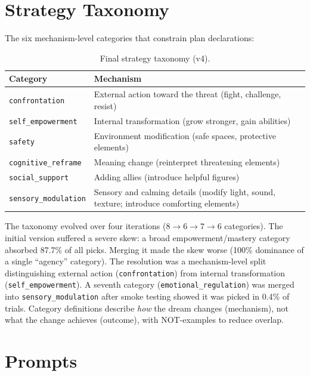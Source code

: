 \section{Strategy Taxonomy}
\label{app:taxonomy}

The six mechanism-level categories that constrain plan declarations:

\begin{table}[h]
  \centering\small
  \begin{tabular}{lp{9.5cm}}
    \toprule
    Category & Mechanism \\
    \midrule
    \texttt{confrontation} & External action toward the threat (fight, challenge, resist) \\
    \texttt{self\_empowerment} & Internal transformation (grow stronger, gain abilities) \\
    \texttt{safety} & Environment modification (safe spaces, protective elements) \\
    \texttt{cognitive\_reframe} & Meaning change (reinterpret threatening elements) \\
    \texttt{social\_support} & Adding allies (introduce helpful figures) \\
    \texttt{sensory\_modulation} & Sensory and calming details (modify light, sound, texture; introduce comforting elements) \\
    \bottomrule
  \end{tabular}
  \caption{Final strategy taxonomy (v4).}
\end{table}

The taxonomy evolved over four iterations ($8 \to 6 \to 7 \to 6$ categories). The initial version suffered a severe skew: a broad empowerment/mastery category absorbed 87.7\% of all picks. Merging it made the skew worse (100\% dominance of a single ``agency'' category). The resolution was a mechanism-level split distinguishing external action (\texttt{confrontation}) from internal transformation (\texttt{self\_empowerment}). A seventh category (\texttt{emotional\_regulation}) was merged into \texttt{sensory\_modulation} after smoke testing showed it was picked in 0.4\% of trials. Category definitions describe \emph{how} the dream changes (mechanism), not what the change achieves (outcome), with NOT-examples to reduce overlap.

\section{Prompts}
\label{app:prompts}

